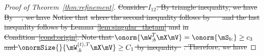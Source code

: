 \documentclass[lettersize,onecolumn,journal]{IEEEtran}
\theoremstyle{definition}
\theoremstyle{definition}
\providecommand{\DIFdeltex}[1]{{\protect\color{red}\sout{#1}}}                      %
\providecommand{\DIFdel}[1]{\texorpdfstring{\DIFdeltex{#1}}{}} %
\begin{document}
\begin{proof}[Proof of Theorem~\ref{thm:refinement}]
\DIFdel{Consider $I_{12}$. By triangle inequality, we have 
    }%
\DIFdel{By \mbox{%
\citet[Proof of Lemma 5]{han2020exact}}\hspace{0pt}%
, we have 
    }%
\DIFdel{Notice that 
    }%
\DIFdel{where the second inequality follows by  \mbox{%
\citet[Inequality (121), Proof of Lemma 5]{han2020exact} }\hspace{0pt}%
and the last inequality follows by Lemma~\ref{lem:singular_thetam} and }%
\DIFdel{in Condition~\ref{cond:origin}.
     Note that $\onorm{\mW_{:b}^T \mX \mV} = \onorm{\mS_{b:}} \geq c_3$ and $\onormSize{}{  \mW_{:b}^{(t),T} \mX \mV } \geq C_1$ by inequality~}%
\DIFdel{. Therefore, we have 
     }%

\end{proof}
\end{document}

